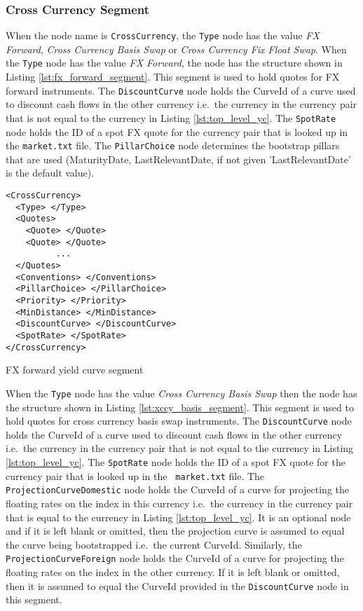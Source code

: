 \subsubsection*{Cross Currency Segment}
When the node name is \lstinline!CrossCurrency!, the \lstinline!Type! node has the value \emph{FX Forward}, \emph{Cross
Currency Basis Swap} or \emph{Cross Currency Fix Float Swap}. When the \lstinline!Type! node has the value \emph{FX
Forward}, the node has the structure shown in Listing \ref{lst:fx_forward_segment}. This segment is used to hold quotes
for FX forward instruments. The \lstinline!DiscountCurve! node holds the CurveId of a curve used to discount cash flows
in the other currency i.e.\ the currency in the currency pair that is not equal to the currency in Listing
\ref{lst:top_level_yc}. The \lstinline!SpotRate! node holds the ID of a spot FX quote for the currency pair that is
looked up in the {\tt market.txt} file. The \lstinline!PillarChoice! node determines the bootstrap pillars that are used
(MaturityDate, LastRelevantDate, if not given 'LastRelevantDate' is the default value).

\begin{listing}[H]
\begin{verbatim}
<CrossCurrency>
  <Type> </Type>
  <Quotes>
    <Quote> </Quote>
    <Quote> </Quote>
          ...
  </Quotes>
  <Conventions> </Conventions>
  <PillarChoice> </PillarChoice>
  <Priority> </Priority>
  <MinDistance> </MinDistance>
  <DiscountCurve> </DiscountCurve>
  <SpotRate> </SpotRate>
</CrossCurrency>
\end{verbatim}
\caption{FX forward yield curve segment}
\label{lst:fx_forward_segment}
\end{listing}

When the \lstinline!Type! node has the value \emph{Cross Currency Basis Swap} then the node has the structure shown in
Listing \ref{lst:xccy_basis_segment}. This segment is used to hold quotes for cross currency basis swap instruments. The
\lstinline!DiscountCurve! node holds the CurveId of a curve used to discount cash flows in the other currency i.e.\ the
currency in the currency pair that is not equal to the currency in Listing \ref{lst:top_level_yc}. The
\lstinline!SpotRate! node holds the ID of a spot FX quote for the currency pair that is looked up in the {\tt
  market.txt} file. The \lstinline!ProjectionCurveDomestic! node holds the CurveId of a curve for projecting the
floating rates on the index in this currency i.e.\ the currency in the currency pair that is equal to the currency in
Listing \ref{lst:top_level_yc}. It is an optional node and if it is left blank or omitted, then the projection curve is
assumed to equal the curve being bootstrapped i.e.\ the current CurveId. Similarly, the
\lstinline!ProjectionCurveForeign! node holds the CurveId of a curve for projecting the floating rates on the index in
the other currency. If it is left blank or omitted, then it is assumed to equal the CurveId provided in the
\lstinline!DiscountCurve! node in this segment.

